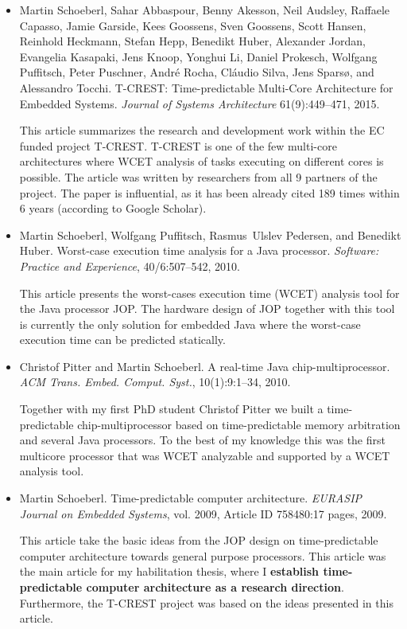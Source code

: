 \documentclass[%
    a4paper,
    11pt, %
    headinclude, footexclude,
    notitlepage,
    headsepline,
    pointlessnumbers,
    ]{scrartcl}
\begin{document}
\begin{itemize}

\item Martin Schoeberl, Sahar Abbaspour, Benny Akesson, Neil Audsley, Raffaele Capasso, Jamie Garside, Kees Goossens, Sven Goossens, Scott Hansen, Reinhold Heckmann, Stefan Hepp, Benedikt Huber, Alexander Jordan, Evangelia Kasapaki, Jens Knoop, Yonghui Li, Daniel Prokesch, Wolfgang Puffitsch, Peter Puschner, Andr\'{e} Rocha, Cl\'{a}udio Silva, Jens Spars{\o}, and Alessandro Tocchi.
 T-CREST: Time-predictable Multi-Core Architecture for Embedded Systems.
 \emph{Journal of Systems Architecture} 61(9):449--471, 2015.
 
 
This article summarizes the research and development work within the EC funded
project T-CREST. T-CREST is one of the few multi-core architectures where
WCET analysis of tasks executing on different cores is possible.
The article was written by researchers from all 9 partners of
the project. The paper is influential, as it has been already cited 189 times
within 6 years (according to Google Scholar).

\item Martin Schoeberl, Wolfgang Puffitsch, Rasmus~Ulslev
    Pedersen, and Benedikt Huber. Worst-case execution time
  analysis for a {Java} processor. {\em Software: Practice and
  Experience}, 40/6:507--542, 2010.
  
This article presents the worst-cases execution time (WCET) analysis tool for
the Java processor JOP.
The hardware design of JOP together with this tool is currently the only
solution for embedded Java where the worst-case execution time can
be predicted statically.

\item Christof Pitter and Martin Schoeberl.
A real-time {Java} chip-multiprocessor.
{\em ACM Trans. Embed. Comput. Syst.}, 10(1):9:1--34, 2010.

Together with my first PhD student Christof Pitter we built a time-predictable
chip-multiprocessor based on time-predictable memory arbitration and
several Java processors. To the best of my knowledge this was the first multicore
processor that was WCET analyzable and supported by a WCET analysis
tool.

\item Martin Schoeberl. Time-predictable computer architecture.
    {\em EURASIP Journal on Embedded Systems}, vol. 2009, Article
    ID 758480:17 pages, 2009.
    
This article take the basic ideas from the JOP design on time-predictable
computer architecture towards general purpose processors. This article was
the main article for my habilitation thesis, where I {\bf establish time-predictable
computer architecture as a research direction}.
Furthermore, the T-CREST project was based on the ideas presented in this article.



\end{itemize}
\end{document}
